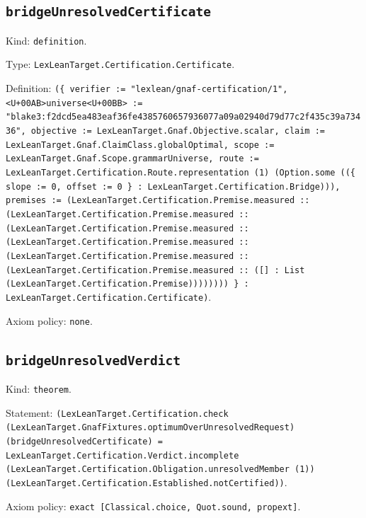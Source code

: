 \documentclass[11pt]{article}
\begin{document}
\subsection*{\texttt{bridgeUnresolvedCertificate}}
\noindent Kind: \texttt{definition}.\par
\noindent Type: \texttt{LexLeanTarget.Certification.Certificate}.\par
\noindent Definition: \texttt{(\{ verifier := "lexlean/gnaf-certification/1", <U+00AB>universe<U+00BB> := "blake3:f2dcd5ea483eaf36fe4385760657936077a09a02940d79d77c2f435c39a73436", objective := LexLeanTarget.Gnaf.Objective.scalar, claim := LexLeanTarget.Gnaf.ClaimClass.globalOptimal, scope := LexLeanTarget.Gnaf.Scope.grammarUniverse, route := LexLeanTarget.Certification.Route.representation (1) (Option.some ((\{ slope := 0, offset := 0 \} : LexLeanTarget.Certification.Bridge))), premises := (LexLeanTarget.Certification.Premise.measured :: (LexLeanTarget.Certification.Premise.measured :: (LexLeanTarget.Certification.Premise.measured :: (LexLeanTarget.Certification.Premise.measured :: (LexLeanTarget.Certification.Premise.measured :: (LexLeanTarget.Certification.Premise.measured :: ([] : List (LexLeanTarget.Certification.Premise)))))))) \} : LexLeanTarget.Certification.Certificate)}.\par
\noindent Axiom policy: \texttt{none}.\par
\subsection*{\texttt{bridgeUnresolvedVerdict}}
\noindent Kind: \texttt{theorem}.\par
\noindent Statement: \texttt{(LexLeanTarget.Certification.check (LexLeanTarget.GnafFixtures.optimumOverUnresolvedRequest) (bridgeUnresolvedCertificate) = LexLeanTarget.Certification.Verdict.incomplete (LexLeanTarget.Certification.Obligation.unresolvedMember (1)) (LexLeanTarget.Certification.Established.notCertified))}.\par
\noindent Axiom policy: \texttt{exact [Classical.choice, Quot.sound, propext]}.\par
\end{document}
